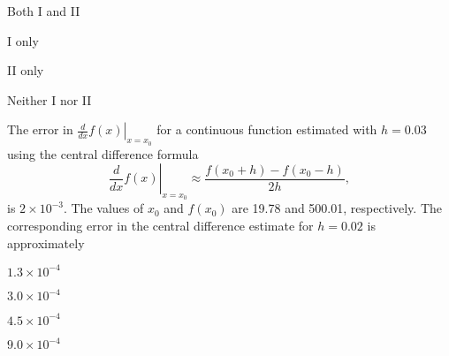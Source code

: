 \begin{enumerate}
    \begin{multicols}{4}
        \item Both I and II
        \item I only
        \item II only
        \item Neither I nor II
    \end{multicols}
\end{enumerate} 

\item The error in $\left. \frac{d}{dx} f(x) \right|_{x = x_0}$ for a continuous function estimated with $h = 0.03$ using the central difference formula
\[
\left. \frac{d}{dx} f(x) \right|_{x = x_0} \approx \frac{f(x_0 + h) - f(x_0 - h)}{2h},
\]
is $2 \times 10^{-3}$. The values of $x_0$ and $f(x_0)$ are 19.78 and 500.01, respectively. The corresponding error in the central difference estimate for $h = 0.02$ is approximately
\begin{enumerate}
    \begin{multicols}{4}
        \item $1.3 \times 10^{-4}$
        \item $3.0 \times 10^{-4}$
        \item $4.5 \times 10^{-4}$
        \item $9.0 \times 10^{-4}$
    \end{multicols}
\end{enumerate}


